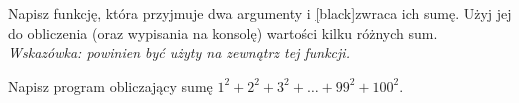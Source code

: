 % 
% 
% 
% 



\dbEntryCheckResults
Napisz funkcję, która przyjmuje dwa argumenty i \ul[black]{zwraca} ich sumę. Użyj jej do obliczenia (oraz wypisania na konsolę) wartości kilku różnych sum.
\\\textit{Wskazówka:  powinien być użyty na zewnątrz tej funkcji.}

\fi

\dbEntryCheckResults
Napisz program obliczający sumę $1^2 + 2^2 + 3^2 + \ldots + 99^2 + 100^2$. 
\fi

